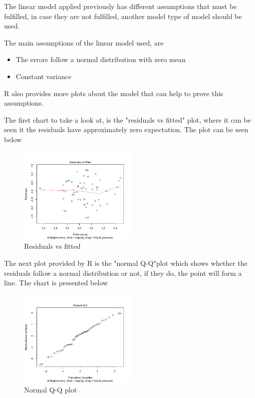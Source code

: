 \documentclass{article}
\begin{document}
The linear model applied previously has different assumptions that must be fulfilled, in case they are not fulfilled, another model type of model should be used.  

The main assumptions of the linear model used, are 

\begin{itemize}
    \item The errors follow a normal distribution with zero mean
    \item Constant variance
\end{itemize}
R also provides more plots about the model that can help to prove this assumptions. 

The first chart to take a look at, is the "residuals vs fitted" plot, where it can be seen it the residuals have approximately zero expectation. The plot can be seen below

\begin{figure}[H]
\centering
\includegraphics[width=0.5\textwidth]{rvsf.png}
\caption{\label{fig:frogg} Residuals vs fitted }
\end{figure}

The next plot provided by R is the "normal Q-Q"plot which shows whether the residuals follow a normal distribution or not, if they do, the point will form a line. The chart is presented below

\begin{figure}[H]
\centering
\includegraphics[width=0.5\textwidth]{qq.png}
\caption{\label{fig:frogg} Normal Q-Q plot }
\end{figure}
\end{document}
